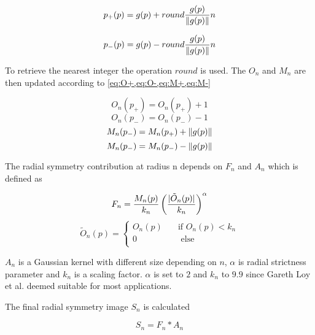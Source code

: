 \begin{equation} \label{eq:p+}
p_{+}(p) = g(p) + round\frac{g(p)}{\lVert g(p)\rVert}n
\end{equation}

\begin{equation} \label{eq:p-}
p_{-}(p) = g(p) - round\frac{g(p)}{\lVert g(p)\rVert}n
\end{equation}

To retrieve the nearest integer the operation $round$ is used. The $O_n$ and $M_n$ are then updated according to \cref{eq:O+,eq:O-,eq:M+,eq:M-}

\begin{equation} \label{eq:O+}
O_{n}(p_{+}) = O_{n}(p_{+}) + 1
\end{equation}
\begin{equation} \label{eq:O-}
O_{n}(p_{-}) = O_{n}(p_{-}) - 1
\end{equation}
\begin{equation} \label{eq:M+}
M_{n}(p_{-}) = M_{n}(p_{+}) + \lVert g(p)\rVert
\end{equation}
\begin{equation} \label{eq:M-}
M_{n}(p_{-}) = M_{n}(p_{-}) - \lVert g(p)\rVert
\end{equation}

The radial symmetry contribution at radius n depends on $F_n$ and $A_n$ which is defined as 

\begin{equation} \label{eq:F}
F_n = \frac{M_{n}(p)}{k_n} \left(\frac{\lvert\tilde{O}_n(p)\rvert}{k_n}\right)^{\alpha}
\end{equation}
\begin{equation} \label{eq:A}
 \tilde{O}_n(p) =   
 \begin{cases}
 O_n(p)    & \quad \text{if } O_n(p) < k_n\\
 0		& \quad  \text{ else}\\
 \end{cases}
\end{equation}

$A_n$ is a Gaussian kernel with different size depending on $n$, $\alpha$ is radial strictness parameter and $k_n$ is a scaling factor. $\alpha$ is set to $2$ and $k_n$ to $9.9$ since Gareth Loy et al. deemed suitable for most applications.

The final radial symmetry image $S_n$ is calculated 

\begin{equation} \label{eq:M-}
S_{n} = F_n * A_n
\end{equation}

